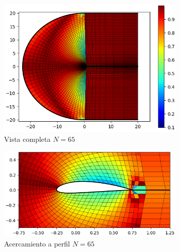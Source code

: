 \documentclass[letterpaper, openright, 12pt]{book}
\begin{document}
    \begin{figure}[htbp!]
        \begin{subfigure}[c]{0.48\textwidth}
            \includegraphics[keepaspectratio, width = 0.99\textwidth]
                {./img/naca4415_c_n_65_skew_far}
            \caption{Vista completa $N=65$}
            \label{fig:naca4415_c_n_65_skew_far}
        \end{subfigure}
        \hfill
        \begin{subfigure}[c]{0.48\textwidth}
            \includegraphics[keepaspectratio, width=0.99\textwidth]
                {./img/naca4415_c_n_65_skew_close}
            \caption{Acercamiento a perfil $N = 65$}
        \end{subfigure}
        \begin{subfigure}[c]{0.48\textwidth}

\end{subfigure}
\end{figure}
\end{document}
